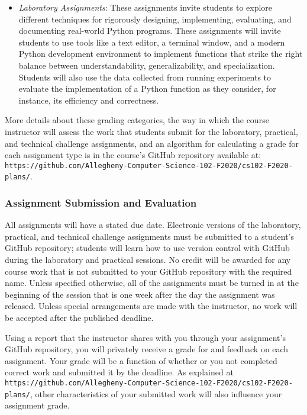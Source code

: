 \documentclass[11pt]{article}
\newcommand{\url}[1]{\lstinline{#1}}
\begin{document}
\begin{itemize}
  \item {\em Laboratory Assignments\/}: These assignments invite students to
    explore different techniques for rigorously designing, implementing,
    evaluating, and documenting real-world Python programs. These assignments
    will invite students to use tools like a text editor, a terminal window,
    and a modern Python development environment to implement functions that
    strike the right balance between understandability, generalizability, and
    specialization. Students will also use the data collected from running
    experiments to evaluate the implementation of a Python function as they
    consider, for instance, its efficiency and correctness.

\end{itemize}

\noindent More details about these grading categories, the way in which the
course instructor will assess the work that students submit for the laboratory,
practical, and technical challenge assignments, and an algorithm for
calculating a grade for each assignment type is in the course's GitHub
repository available at:
\url{https://github.com/Allegheny-Computer-Science-102-F2020/cs102-F2020-plans/}.

\subsubsection*{Assignment Submission and Evaluation}

All assignments will have a stated due date. Electronic versions of the
laboratory, practical, and technical challenge assignments must be submitted to
a student's GitHub repository; students will learn how to use version control
with GitHub during the laboratory and practical sessions. No credit will be
awarded for any course work that is not submitted to your GitHub repository
with the required name. Unless specified otherwise, all of the assignments must
be turned in at the beginning of the session that is one week after the day the
assignment was released. Unless special arrangements are made with the
instructor, no work will be accepted after the published deadline.

Using a report that the instructor shares with you through your assignment's
GitHub repository, you will privately receive a grade for and feedback on each
assignment. Your grade will be a function of whether or you not completed
correct work and submitted it by the deadline. As explained at
\url{https://github.com/Allegheny-Computer-Science-102-F2020/cs102-F2020-plans/},
other characteristics of your submitted work will also influence your assignment
grade.
\end{document}
